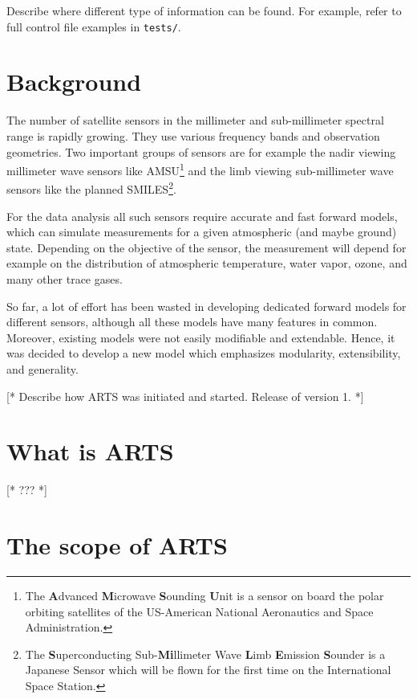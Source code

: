 Describe where different type of information can be found. For
example, refer to full control file examples in \verb|tests/|.





\section{Background}
\label{sec:intro:background}

The number of satellite sensors in the millimeter and sub-millimeter
spectral range is rapidly growing. They use various frequency
bands and observation geometries. Two important groups of
sensors are for example the nadir viewing millimeter wave
sensors like AMSU\footnote{The \textbf{A}dvanced
  \textbf{M}icrowave \textbf{S}ounding \textbf{U}nit is a
  sensor on board the polar orbiting satellites of the
  US-American National Aeronautics and Space Administration.}
and the limb viewing sub-millimeter wave sensors like the
planned SMILES\footnote{The \textbf{S}uperconducting
  Sub-\textbf{Mi}llimeter Wave \textbf{L}imb \textbf{E}mission
  \textbf{S}ounder is a Japanese Sensor which will be flown
  for the first time on the International Space Station.}.

For the data analysis all such sensors require accurate and
fast forward models, which can simulate measurements for a
given atmospheric (and maybe ground) state. Depending on the
objective of the sensor, the measurement will depend for
example on the distribution of atmospheric temperature, water
vapor, ozone, and many other trace gases.

So far, a lot of effort has been wasted in developing dedicated
forward models for different sensors, although all these models have
many features in common. Moreover, existing models were not easily
modifiable and extendable. Hence, it was decided to develop a new
model which emphasizes modularity, extensibility, and generality.

[* Describe how ARTS was initiated and started. Release of version 1. *]


\section{What is ARTS}
\label{sec:intro:whatis}

[* ??? *]


\section{The scope of ARTS}
\label{sec:intro:scope}

